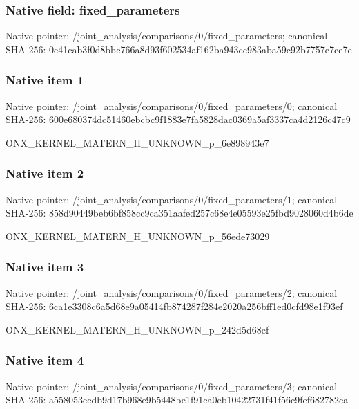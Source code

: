 \documentclass[10pt,a4paper]{article}
\begin{document}
\subsubsection{Native field: fixed\_\allowbreak{}parameters}
Native pointer: /joint\_\allowbreak{}analysis/comparisons/0/fixed\_\allowbreak{}parameters; canonical SHA-256: 0e41cab3f0d8bbc766a8d93f602534af162ba943cc983aba59c92b7757e7ce7e

\subsubsection{Native item 1}
Native pointer: /joint\_\allowbreak{}analysis/comparisons/0/fixed\_\allowbreak{}parameters/0; canonical SHA-256: 600e680374dc51460ebcbc9f1883e7fa5828dac0369a5af3337ca4d2126c47c9

\begingroup\raggedright\sloppy ONX\_\allowbreak{}KERNEL\_\allowbreak{}MATERN\_\allowbreak{}H\_\allowbreak{}UNKNOWN\_\allowbreak{}p\_\allowbreak{}6e898943e7\par\endgroup

\subsubsection{Native item 2}
Native pointer: /joint\_\allowbreak{}analysis/comparisons/0/fixed\_\allowbreak{}parameters/1; canonical SHA-256: 858d90449beb6bf858cc9ca351aafed257c68e4e05593e25fbd9028060d4b6de

\begingroup\raggedright\sloppy ONX\_\allowbreak{}KERNEL\_\allowbreak{}MATERN\_\allowbreak{}H\_\allowbreak{}UNKNOWN\_\allowbreak{}p\_\allowbreak{}56ede73029\par\endgroup

\subsubsection{Native item 3}
Native pointer: /joint\_\allowbreak{}analysis/comparisons/0/fixed\_\allowbreak{}parameters/2; canonical SHA-256: 6ca1e3308c6a5d68e9a05414fb874287f284e2020a256bff1ed0cfd98e1f93ef

\begingroup\raggedright\sloppy ONX\_\allowbreak{}KERNEL\_\allowbreak{}MATERN\_\allowbreak{}H\_\allowbreak{}UNKNOWN\_\allowbreak{}p\_\allowbreak{}242d5d68ef\par\endgroup

\subsubsection{Native item 4}
Native pointer: /joint\_\allowbreak{}analysis/comparisons/0/fixed\_\allowbreak{}parameters/3; canonical SHA-256: a558053ecdb9d17b968e9b5448be1f91ca0eb10422731f41f56c9fef682782ca
\end{document}
